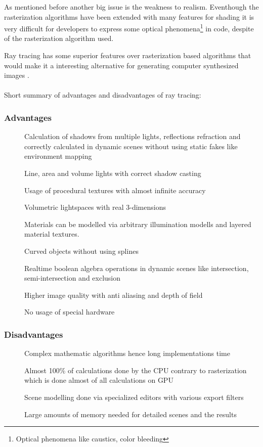 \documentclass[DIV10, abstracton, openright, footsepline, headsepline, twoside, 9pt,
bigheadings]{scrreprt}
\begin{document}
As mentioned before another big issue is the weakness to realism. Eventhough the
rasterization algorithms have been extended with many features for shading it
is very difficult for developers to express some optical
phenomena\footnote{Optical phenomena like caustics, color bleeding} in code, despite
of the rasterization algorithm used.

Ray tracing has some superior features over rasterization based
algorithms that would make it a interesting alternative for generating computer
synthesized images \cite{Wald101}.\\\\
Short summary of advantages and disadvantages of ray tracing:
\subsubsection*{Advantages}
\begin{description}
\item[\color{Bigblue}{$\triangleright$}] Calculation of shadows from multiple lights,
reflections refraction and correctly calculated in dynamic scenes without using
static fakes like environment mapping
\item[\color{Bigblue}{$\triangleright$}] Line, area and volume lights with correct shadow casting
\item[\color{Bigblue}{$\triangleright$}] Usage of procedural textures with almost infinite
accuracy
\item[\color{Bigblue}{$\triangleright$}] Volumetric lightspaces with real 3-dimensions
\item[\color{Bigblue}{$\triangleright$}] Materials can be modelled via arbitrary illumination
modells and layered material textures.
\item[\color{Bigblue}{$\triangleright$}] Curved objects without using splines
\item[\color{Bigblue}{$\triangleright$}] Realtime boolean algebra operations in dynamic scenes
like intersection, semi-intersection and exclusion
\item[\color{Bigblue}{$\triangleright$}] Higher image quality with anti aliasing and depth of
field
\item[\color{Bigblue}{$\triangleright$}] No usage of special hardware
\end{description}
\subsubsection*{Disadvantages}
\begin{description}
\item[\color{Bigblue}{$\triangleright$}] Complex mathematic algorithms hence long
implementations time
\item[\color{Bigblue}{$\triangleright$}] Almost 100\% of calculations done by the CPU contrary
to rasterization which is done almost of all calculations on GPU
\item[\color{Bigblue}{$\triangleright$}] Scene modelling done via specialized editors
with various export filters
\item[\color{Bigblue}{$\triangleright$}] Large amounts of memory needed for detailed scenes and the results
\end{description}
\end{document}
